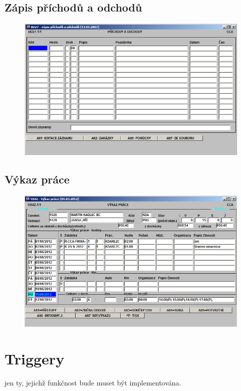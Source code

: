 \documentclass{bakalarka}
\begin{document}
\subsection{Zápis příchodů a odchodů}
\begin{figure}[H]
  \centering
  \includegraphics[scale=0.6]{obr/BD27.png}
  \label{}
\end{figure}

\subsection{Výkaz práce}
\begin{figure}[H]
  \centering
  \includegraphics[scale=0.6]{obr/VX42.png}
  \label{}
\end{figure}

\section{Triggery}
jen ty, jejichž funkčnost bude muset být implementována.
\end{document}
